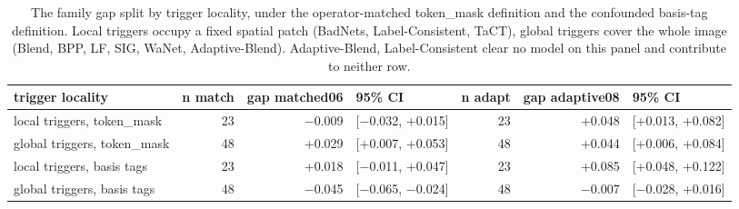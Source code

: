 \begin{table}[htbp]
\centering
\small
\caption{The family gap split by trigger locality, under the operator-matched token_mask definition and the confounded basis-tag definition. Local triggers occupy a fixed spatial patch (BadNets, Label-Consistent, TaCT), global triggers cover the whole image (Blend, BPP, LF, SIG, WaNet, Adaptive-Blend). Adaptive-Blend, Label-Consistent clear no model on this panel and contribute to neither row.}
\label{tab:family-split-local-global}
\begin{adjustbox}{max width=\linewidth}
\begin{tabular}{lrrlrrl}
\toprule
trigger locality & n match & gap matched06 & 95\% CI & n adapt & gap adaptive08 & 95\% CI \\
\midrule
local triggers, token\_mask & 23 & $-$0.009 & [$-$0.032, +0.015] & 23 & +0.048 & [+0.013, +0.082] \\
global triggers, token\_mask & 48 & +0.029 & [+0.007, +0.053] & 48 & +0.044 & [+0.006, +0.084] \\
local triggers, basis tags & 23 & +0.018 & [$-$0.011, +0.047] & 23 & +0.085 & [+0.048, +0.122] \\
global triggers, basis tags & 48 & $-$0.045 & [$-$0.065, $-$0.024] & 48 & $-$0.007 & [$-$0.028, +0.016] \\
\bottomrule
\end{tabular}
\end{adjustbox}
\end{table}
